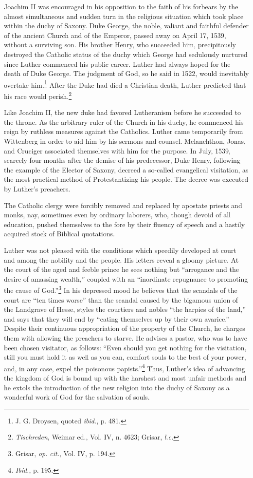 Joachim II was encouraged in his opposition to the faith of his
forbears by the almost simultaneous and sudden turn in the religious
situation which took place within the duchy of Saxony. Duke George,
the noble, valiant and faithful defender of the ancient Church and
of the Emperor, passed away on April 17, 1539, without a surviving
son. His brother Henry, who succeeded him, precipitously destroyed
the Catholic status of the duchy which George had sedulously nurtured
since Luther commenced his public career. Luther had always
hoped for the death of Duke George. The judgment of God, so he
said in 1522, would inevitably overtake him.\footnote{J. G. Droysen, quoted \textit{ibid.}, p. 481.}
After the Duke had
died a Christian death, Luther predicted that his race would perish.\footnote{\textit{Tischreden}, Weimar ed., Vol. IV, n. 4623; Grisar, \textit{l.c.}}

Like Joachim II, the new duke had favored Lutheranism before he
succeeded to the throne. As the arbitrary ruler of the Church in his
duchy, he commenced his reign by ruthless measures against the
Catholics. Luther came temporarily from Wittenberg in order to aid
him by his sermons and counsel. Melanchthon, Jonas, and Cruciger
associated themselves with him for the purpose. In July, 1539, scarcely
four months after the demise of his predecessor, Duke Henry, following
the example of the Elector of Saxony, decreed a so-called
evangelical visitation, as the most practical method of Protestantizing
his people. The decree was executed by Luther’s preachers.

The Catholic clergy were forcibly removed and replaced by apostate
priests and monks, nay, sometimes even by ordinary laborers, who, though
devoid of all education, pushed themselves to the fore by their fluency of
speech and a hastily acquired stock of Biblical quotations.

Luther was not pleased with the conditions which speedily developed at
court and among the nobility and the people. His letters reveal a gloomy
picture. At the court of the aged and feeble prince he sees nothing but
“arrogance and the desire of amassing wealth,” coupled with an “inordinate
repugnance to promoting the cause of God.”\footnote{Grisar, \textit{op. cit.}, Vol. IV, p. 194.}
 In his depressed mood he
believes that the scandals of the court are “ten times worse” than the scandal
caused by the bigamous union of the Landgrave of Hesse, styles the
courtiers and nobles “the harpies of the land,” and says that they will end
by “eating themselves up by their own avarice.” Despite their continuous
appropriation of the property of the Church, he charges them with allowing
the preachers to starve. He advises a pastor, who was to have been
chosen visitator, as follows: “Even should you get nothing for the visitation,
still you must hold it as well as you can, comfort souls to the best of your
power, and, in any case, expel the poisonous papists.”\footnote{\textit{Ibid.}, p. 195.}
 Thus, Luther’s idea
of advancing the kingdom of God is bound up with the harshest and most
unfair methods and he extols the introduction of the new religion into
the duchy of Saxony as a wonderful work of God for the salvation of souls.


